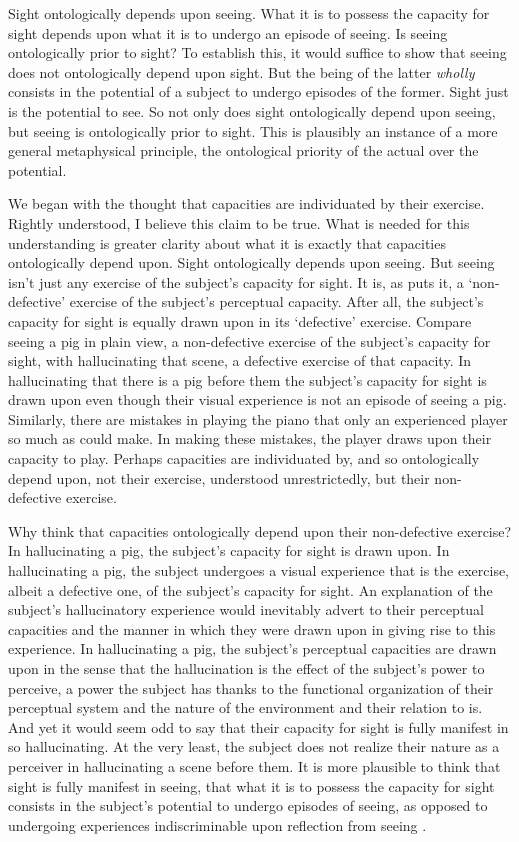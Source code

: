 \documentclass[12pt]{article}
\begin{document}
Sight ontologically depends upon seeing. What it is to possess the capacity for sight depends upon what it is to undergo an episode of seeing. Is seeing ontologically prior to sight? To establish this, it would suffice to show that seeing does not ontologically depend upon sight. But the being of the latter \emph{wholly} consists in the potential of a subject to undergo episodes of the former. Sight just is the potential to see. So not only does sight ontologically depend upon seeing, but seeing is ontologically prior to sight. This is plausibly an instance of a more general metaphysical principle, the ontological priority of the actual over the potential.

We began with the thought that capacities are individuated by their exercise. Rightly understood, I believe this claim to be true. What is needed for this understanding is greater clarity about what it is exactly that capacities ontologically depend upon. Sight ontologically depends upon seeing. But seeing isn't just any exercise of the subject's capacity for sight. It is, as \citet{McDowell:2010fk} puts it, a `non-defective' exercise of the subject's perceptual capacity. After all, the subject's capacity for sight is equally drawn upon in its `defective' exercise. Compare seeing a pig in plain view, a non-defective exercise of the subject's capacity for sight, with hallucinating that scene, a defective exercise of that capacity. In hallucinating that there is a pig before them the subject's capacity for sight is drawn upon even though their visual experience is not an episode of seeing a pig. Similarly, there are mistakes in playing the piano that only an experienced player so much as could make. In making these mistakes, the player draws upon their capacity to play. Perhaps capacities are individuated by, and so ontologically depend upon, not their exercise, understood unrestrictedly, but their non-defective exercise.

Why think that capacities ontologically depend upon their non-defective exercise? In hallucinating a pig, the subject's capacity for sight is drawn upon. In hallucinating a pig, the subject undergoes a visual experience that is the exercise, albeit a defective one, of the subject's capacity for sight. An explanation of the subject's hallucinatory experience would inevitably advert to their perceptual capacities and the manner in which they were drawn upon in giving rise to this experience. In hallucinating a pig, the subject's perceptual capacities are drawn upon in the sense that the hallucination is the effect of the subject's power to perceive, a power the subject has thanks to the functional organization of their perceptual system and the nature of the environment and their relation to is. And yet it would seem odd to say that their capacity for sight is fully manifest in so hallucinating. At the very least, the subject does not realize their nature as a perceiver in hallucinating a scene before them. It is more plausible to think that sight is fully manifest in seeing, that what it is to possess the capacity for sight consists in the subject's potential to undergo episodes of seeing, as opposed to undergoing experiences indiscriminable upon reflection from seeing \citep[compare][especially p. 72]{Martin:2004fj}.
\end{document}
